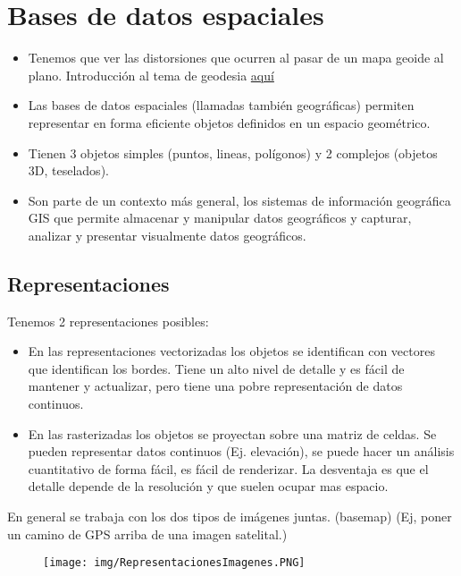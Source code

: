 \section{Bases de datos espaciales}
\begin{itemize}
\item Tenemos que ver las distorsiones que ocurren al pasar de un mapa geoide al plano. Introducción al tema de geodesia \href{https://www.ign.gob.ar/NuestrasActividades/Geodesia/Introduccion}{aquí}
\item Las bases de datos espaciales (llamadas también geográficas) permiten representar en forma eficiente objetos definidos en un espacio geométrico. 
\item Tienen 3 objetos simples (puntos, lineas, polígonos) y 2 complejos (objetos 3D, teselados).
\item Son parte de un contexto más general, los sistemas de información geográfica GIS que permite almacenar y manipular datos geográficos y capturar, analizar y presentar visualmente datos geográficos.
\end{itemize}


\subsection*{Representaciones}
Tenemos 2 representaciones posibles:

\begin{itemize}
\item En las representaciones vectorizadas los objetos se identifican con vectores que identifican los bordes. Tiene un alto nivel de detalle y es fácil de mantener y actualizar, pero tiene una pobre representación de datos continuos.
\item En las rasterizadas los objetos se proyectan sobre una matriz de celdas. Se pueden representar datos continuos (Ej. elevación), se puede hacer un análisis cuantitativo de forma fácil, es fácil de renderizar. La desventaja es que el detalle depende de la resolución y que suelen ocupar mas espacio.
\end{itemize}

En general se trabaja con los dos tipos de imágenes juntas. (basemap) (Ej, poner un camino de GPS arriba de una imagen satelital.)

\begin{figure}[htb]
    \centering
    \texttt{[image: img/RepresentacionesImagenes.PNG]}
\end{figure}


